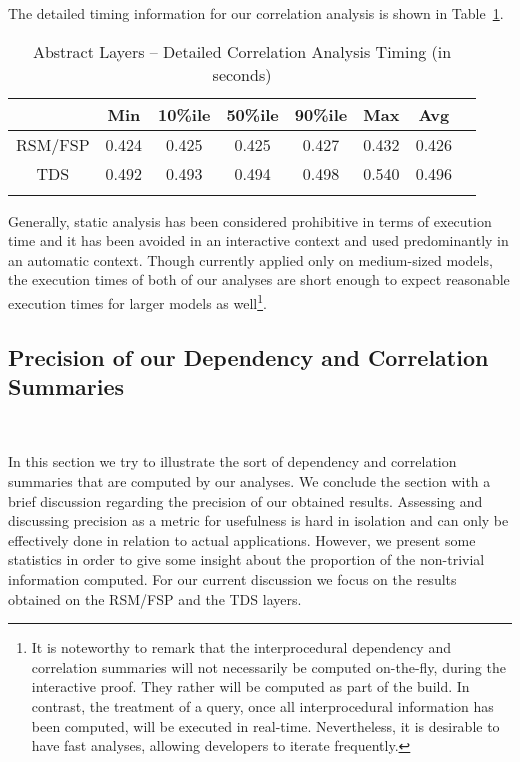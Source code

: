 \documentclass[11pt]{article}
\begin{document}
The detailed timing information for our correlation analysis is shown in Table~\ref{res:statscor2}.

\begin{table}[hbtp]
\caption[Abstract Layers -- Detailed Correlation Analysis Timing]
{Abstract Layers -- Detailed Correlation Analysis Timing (in seconds)}
\centering
\begin{tabular}{cccccccc} \toprule
    {}  & {Min} & {10\%ile} & {50\%ile} & {90\%ile} & {Max} & {Avg} \\ \midrule
RSM/FSP & 0.424 & 0.425     & 0.425     & 0.427     & 0.432 & 0.426 \\ \midrule
TDS     & 0.492 & 0.493     & 0.494     & 0.498     & 0.540 & 0.496 \\ \bottomrule\\
\end{tabular}
\label{res:statscor2}
\end{table}

Generally, static analysis has been considered prohibitive in terms of execution
time and it has been avoided in an interactive context and used predominantly
in an automatic context. Though currently applied only on medium-sized models, 
the execution times of both of our analyses are short enough to expect reasonable 
execution times for larger models as well\footnote{It is noteworthy to remark that
the interprocedural dependency and correlation summaries will not necessarily be
computed on-the-fly, during the interactive proof. They rather will be computed
as part of the build. In contrast, the treatment of a query, once all interprocedural 
information has been computed, will be executed in real-time. Nevertheless, it is desirable
to have fast analyses, allowing developers to iterate frequently.}.  


\subsection{Precision of our Dependency and Correlation Summaries}~\label{ch9:res:precision}

In this section we try to illustrate the sort of dependency and correlation
summaries that are computed by our analyses. We conclude the section with a
brief discussion regarding the precision of our obtained results. Assessing
and discussing precision as a metric for usefulness is hard in isolation and
can only be effectively done in relation to actual applications.
However, we present some statistics in order to give some
insight about the proportion of the non-trivial information computed. For our
current discussion we focus on the results obtained on the RSM/FSP and the TDS 
layers.
\end{document}
